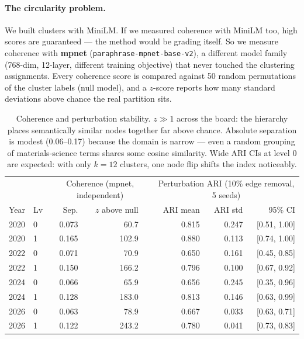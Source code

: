 \documentclass[10pt]{article}
\begin{document}
\paragraph{The circularity problem.}
We built clusters with MiniLM.
If we measured coherence with MiniLM too, high scores are guaranteed — the method
would be grading itself.
So we measure coherence with \textbf{mpnet} (\texttt{paraphrase-mpnet-base-v2}),
a different model family (768-dim, 12-layer, different training objective) that
never touched the clustering assignments.
Every coherence score is compared against 50 random permutations of the cluster
labels (null model), and a $z$-score reports how many standard deviations above
chance the real partition sits.

\begin{table}[t]
\centering\small
\begin{tabular}{llrrr|rrr}
\toprule
 & & \multicolumn{3}{c|}{Coherence (mpnet, independent)} &
     \multicolumn{3}{c}{Perturbation ARI (10\% edge removal, 5 seeds)} \\
Year & Lv & Sep. & $z$ above null && ARI mean & ARI std & 95\% CI \\
\midrule
2020 & 0 & 0.073 & 60.7  && 0.815 & 0.247 & [0.51, 1.00] \\
2020 & 1 & 0.165 & 102.9 && 0.880 & 0.113 & [0.74, 1.00] \\
2022 & 0 & 0.071 & 70.9  && 0.650 & 0.161 & [0.45, 0.85] \\
2022 & 1 & 0.150 & 166.2 && 0.796 & 0.100 & [0.67, 0.92] \\
2024 & 0 & 0.066 & 65.9  && 0.656 & 0.245 & [0.35, 0.96] \\
2024 & 1 & 0.128 & 183.0 && 0.813 & 0.146 & [0.63, 0.99] \\
2026 & 0 & 0.063 & 78.9  && 0.667 & 0.033 & [0.63, 0.71] \\
2026 & 1 & 0.122 & 243.2 && 0.780 & 0.041 & [0.73, 0.83] \\
\bottomrule
\end{tabular}
\caption{Coherence and perturbation stability.
$z \gg 1$ across the board: the hierarchy places semantically similar nodes together
far above chance.
Absolute separation is modest (0.06–0.17) because the domain is narrow — even a
random grouping of materials-science terms shares some cosine similarity.
Wide ARI CIs at level 0 are expected: with only $k=12$ clusters, one node flip
shifts the index noticeably.}
\label{tab:main}
\end{table}
\end{document}
